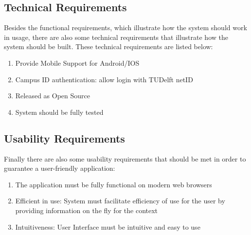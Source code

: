 \subsection{Technical Requirements} %
\label{sub:technical_requirements}

Besides the functional requirements, which illustrate how the system should work in usage, there are also some technical requirements that illustrate how the system should be built. These technical requirements are listed below:

\begin{enumerate}
	\item Provide Mobile Support for Android/IOS
	\item Campus ID authentication: allow login with TUDelft netID
	\item Released as Open Source
 	\item System should be fully tested 
\end{enumerate}

\subsection{Usability Requirements} %

Finally there are also some usability requirements that should be met in order to guarantee a user-friendly application:

\label{sub:usability_requirements}
\begin{enumerate}
	\item The application must be fully functional on modern web browsers
	\item Efficient in use: System must facilitate efficiency of use for the user by providing information on the fly for the context
	\item Intuitiveness: User Interface must be intuitive and easy to use
\end{enumerate}
